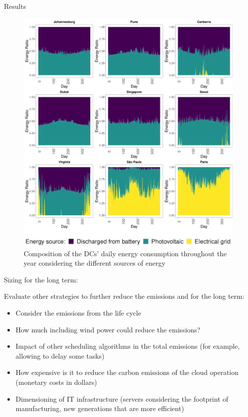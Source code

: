 \documentclass[Ligatures=TeX,table,svgnames,usetotalslideindicator,compress,10pt]{beamer}
\begin{document}
\begin{frame}{Results}

  \begin{figure}[!htbp]
    \centering
    \includegraphics[width=.6\textwidth]{images/energy_ratio.pdf}
    \caption{Composition of the DCs’ daily energy consumption throughout the year considering the different sources of energy}
    \label{fig:sizing}
  \end{figure}

\end{frame}


\begin{frame}{Sizing for the long term:}

  Evaluate other strategies to further reduce the emissions  and for the long term:
  
  \begin{itemize}

  \item Consider the emissions from the life cycle
  \item How much including wind power could reduce the emissions?
  \item Impact of other scheduling algorithms in the total emissions (for example, allowing to delay some tasks)
  \item How expensive is it to reduce the carbon emissions of the cloud operation (monetary costs in dollars)
  \item Dimensioning of IT infrastructure (servers considering the footprint of manufacturing, new generations that are more  efficient)    

  \end{itemize}

  
\end{frame}
\end{document}
